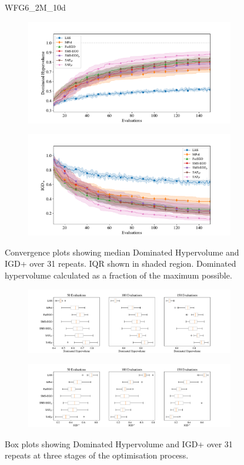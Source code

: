 \documentclass[conference]{IEEEtran}
\begin{document}
\begin{figure}
WFG6\_2M\_10d


\begin{subfigure}[hbt!]{\linewidth}

    \centering
    \includegraphics[width=0.7\linewidth]{figures/wfg6_2obj_10dim_hv_plot.pdf}
\end{subfigure}
\begin{subfigure}[h]{\linewidth}
    \centering
    \includegraphics[width=0.7\linewidth]{figures/wfg6_2obj_10dim_igd_plot.pdf}
\end{subfigure}
    \caption{Convergence plots showing median Dominated Hypervolume and IGD+ over 31 repeats. IQR shown in shaded region. Dominated hypervolume calculated as a fraction of the maximum possible.}
\vspace{\floatsep}
\begin{subfigure}[t]{\linewidth}
    \centering
    \includegraphics[width=0.8\linewidth]{figures/wfg6_2obj_10dim_hv_boxplot.pdf}
\end{subfigure}
\begin{subfigure}[t]{\linewidth}
    \centering
    \includegraphics[width=0.8\linewidth]{figures/wfg6_2obj_10dim_igd_boxplot.pdf}
\end{subfigure}
    \caption{Box plots showing Dominated Hypervolume and IGD+ over 31 repeats at three stages of the optimisation process.}
\end{figure}
\clearpage
\end{document}
